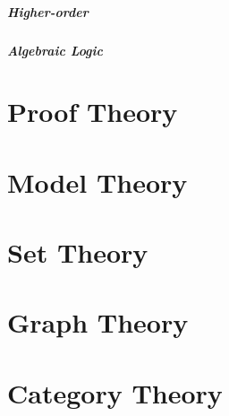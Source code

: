 \documentclass{article}
\begin{document}
\subsubsection{Higher-order}

\subsubsection{Algebraic Logic}



\part{Proof Theory}


\part{Model Theory}


\part{Set Theory}


\part{Graph Theory}


\part{Category Theory}

\end{document}
